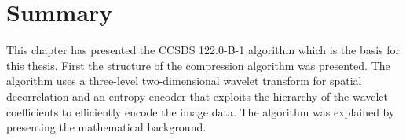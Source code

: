 \section{Summary}\label{sec:fundamentals:ccsds_summary}

This chapter has presented the CCSDS 122.0-B-1 algorithm which is the basis for this thesis. First the structure of the compression algorithm was presented. The algorithm uses a three-level two-dimensional wavelet transform for spatial decorrelation and an entropy encoder that exploits the hierarchy of the wavelet coefficients to efficiently encode the image data. The algorithm was explained by presenting the mathematical background.

